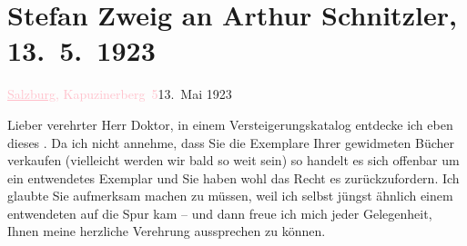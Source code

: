 

\renewcommand{\erwaehntePersonen}{Personen: Olga Schnitzler, Jakob Wassermann, Stefan Zweig}
\renewcommand{\erwaehnteInstitutionen}{Institutionen: Antiquariat Emil Hirsch}
\renewcommand{\erwaehnteOrte}{Orte: Paschinger Schlössl, Salzburg, Wien}
\renewcommand{\erwaehnteWerke}{Werke: ?? [Widmungsexemplar eines unbekannten Buchs an Stefan Zweig, 1923], Das Gänsemännchen. Roman}
\section[Stefan Zweig an Arthur Schnitzler, 13. 5. 1923]{Stefan Zweig an Arthur Schnitzler, 13. 5. 1923}
\nopagebreak{}
\rehead{ }\normalsize\beginnumbering{}
\toendnotes[C]{\smallbreak\pagebreak[2]}
\toendnotes[C]{\smallbreak}
\pstart
           {\pb}\textcolor{pink}{\uline{Salzburg}, Kapuzinerberg 5}{}\ledrightnote{\textcolor{pink}{Paschinger Schlössl}}\hfill 13. Mai 1923\pend
           
\pstart
           Lieber verehrter Herr Doktor, in einem Versteigerungskatalog
               entdecke ich eben dieses \label{K_L03665-1v}\label{K_L03665-1h}. Da ich nicht annehme, dass Sie die Exemplare Ihrer gewidmeten Bücher
               verkaufen (vielleicht werden wir bald so weit sein) so handelt es sich offenbar um
               ein entwendetes Exemplar und Sie haben wohl das Recht es zurückzufordern. Ich glaubte
               Sie aufmerksam machen zu müssen, weil ich selbst jüngst ähnlich einem entwendeten
                  \label{K_L03665-2v}\label{K_L03665-2h} auf die Spur kam – und dann freue ich mich jeder Gelegenheit,
               Ihnen meine herzliche Verehrung aussprechen zu können. \pend
           
